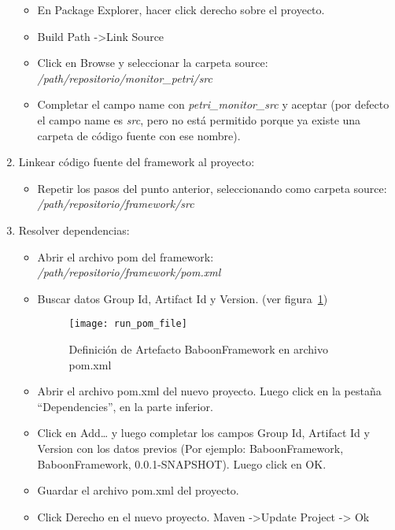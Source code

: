 \begin{enumerate}
        \begin{itemize}
          \item En Package Explorer, hacer click derecho sobre el proyecto.
          \item Build Path -\textgreater Link Source
          \item Click en Browse y seleccionar la carpeta source:               
          \emph{/path/repositorio/monitor\_petri/src}
          \item Completar el campo name con \emph{petri\_monitor\_src} y aceptar
          (por defecto el campo name es \emph{src}, pero no está
          permitido porque ya existe una carpeta de código fuente con ese nombre).
        \end{itemize}
   \item Linkear código fuente del framework al proyecto: 
        \begin{itemize}
          \item Repetir los pasos del punto anterior, seleccionando como carpeta
          source: \emph{/path/repositorio/framework/src}
        \end{itemize}
   \item Resolver dependencias:
        \begin{itemize}
          \item Abrir el archivo pom del framework:
                \emph{/path/repositorio/framework/pom.xml}
          \item Buscar datos Group Id, Artifact Id y Version. (ver
          figura~\ref{fig:run_pom_file}) 
            \begin{figure}[H]
                \centering
                \texttt{[image: run\_pom\_file]}
                \caption{Definición de Artefacto BaboonFramework en archivo
                pom.xml}
            \label{fig:run_pom_file}
                \end{figure}
          \item Abrir el archivo pom.xml del nuevo proyecto. Luego click en la
          pestaña “Dependencies”, en la parte inferior.
          \item Click en Add… y  luego completar los campos Group Id, Artifact
          Id y Version con los datos previos (Por ejemplo:
          BaboonFramework, BaboonFramework, 0.0.1-SNAPSHOT). Luego click en OK.
          \item Guardar el archivo pom.xml del proyecto.
          \item Click Derecho en el nuevo proyecto. Maven -\textgreater Update Project -\textgreater
          Ok
        \end{itemize}
\end{enumerate}


